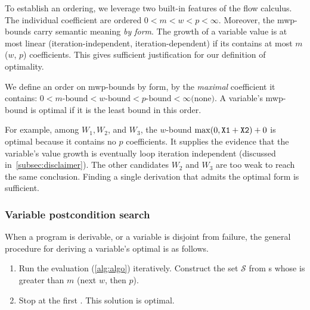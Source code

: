 To establish an ordering, we leverage two built-in features of the flow
calculus. The individual coefficient are ordered \(0 < m < w < p <
\infty\). Moreover, the
mwp-bounds carry semantic meaning \emph{by form}. The growth of a variable value
is at most {linear} (\resp iteration-independent, iteration-dependent) if its
 contains at most \(m\) (\resp \(w\), \(p\))
coefficients. This gives sufficient justification for
our definition of optimality.

\begin{definition}[Optimality]
We define an order on mwp-bounds by form, by the \emph{maximal} coefficient it
contains: \(0 < m\text{-bound} < w\text{-bound} < p\text{-bound} < \infty
\text{(none)}\). A variable's mwp-bound is optimal if
it is the least bound in this order.
\end{definition}

\noindent For example, among \(W_1, W_2\), and \(W_3\), the
\(w\)-bound \(\max(0,\prm{X1}+\prm{X2})+0\) is optimal because it
contains no \(p\) coefficients. It supplies the
evidence that the variable's value growth is eventually loop iteration
independent (discussed in~\autoref{subsec:disclaimer}). The other candidates
\(W_2\) and \(W_3\) are too weak to reach the same conclusion. Finding a single
derivation that admits the optimal form is sufficient.

\subsubsection{Variable postcondition search}
\label{subsec:pc-search}

When a program is derivable, or a variable is disjoint from failure, the general
procedure for deriving a variable's optimal  is as follows.

\begin{enumerate}
\item
Run the  evaluation (\autoref{alg:algo}) iteratively. Construct
the set \(\mathcal{S}\) from s whose  is greater than \(m\) (next \(w\), then
\(p\)).
\item Stop at the first .
This solution is optimal.
\end{enumerate}

